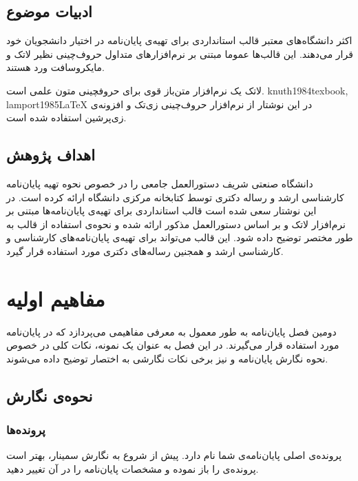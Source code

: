 \subsection{ادبیات موضوع}

اکثر دانشگاه‌های معتبر قالب استانداردی برای تهیه‌ی پایان‌نامه در اختیار دانشجویان خود قرار می‌دهند.
این قالب‌ها عموما مبتنی بر نرم‌افزارهای متداول حروف‌چینی نظیر لاتک و مایکروسافت ورد هستند.

 لاتک یک نرم‌افزار متن‌باز قوی برای حروفچینی متون علمی است.
 {knuth1984texbook, lamport1985LaTeX} 
در این نوشتار از نرم‌افزار حروف‌چینی زی‌تک 
 و افزونه‌ی زی‌پرشین
 استفاده شده است.


\subsection{اهداف پژوهش}

دانشگاه صنعتی شریف دستورالعمل جامعی را در خصوص
نحوه تهیه پایان‌نامه کارشناسی ارشد و رساله دکتری توسط کتابخانه مرکزی دانشگاه ارائه کرده است.
در این نوشتار سعی شده است قالب استانداردی برای تهیه‌ی پایان‌نامه‌ها مبتنی بر نرم‌افزار لاتک و
بر اساس دستورالعمل مذکور ارائه شده و
نحوه‌ی استفاده از قالب به طور مختصر توضیح داده شود.
این قالب  می‌تواند برای تهیه‌ی پایان‌نامه‌های کارشناسی و کارشناسی ارشد 
و همجنین رساله‌ها‌ی دکتری مورد استفاده قرار گیرد.


\section{مفاهیم اولیه}


دومین فصل پایان‌نامه به طور معمول به معرفی مفاهیمی می‌پردازد که در پایان‌نامه مورد استفاده قرار می‌گیرند.
در این فصل به عنوان یک نمونه، نکات کلی در خصوص نحوه نگارش پایان‌نامه و
نیز برخی نکات نگارشی به اختصار توضیح داده می‌شوند.

\subsection{نحوه‌ی نگارش}

\subsubsection{پرونده‌ها}

پرونده‌ی اصلی پایان‌نامه‌ی شما   نام دارد.
پیش از شروع به نگارش سمینار، بهتر است پرونده‌ی  را باز نموده و مشخصات پایان‌نامه را در آن تغییر دهید.


